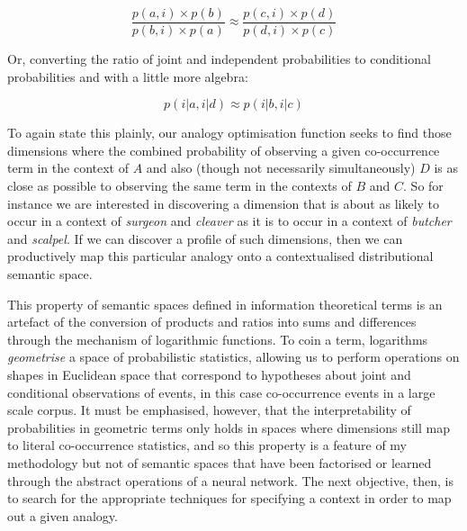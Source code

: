 \begin{equation}
\frac{p(a,i) \times p(b)}{p(b,i) \times p(a)} \approx \frac{p(c,i) \times p(d)}{p(d,i) \times p(c)}
\end{equation}

\noindent Or, converting the ratio of joint and independent probabilities to conditional probabilities and with a little more algebra:

\begin{equation}
p(i|a,i|d) \approx p(i|b,i|c)
\end{equation}

\noindent To again state this plainly, our analogy optimisation function seeks to find those dimensions where the combined probability of observing a given co-occurrence term in the context of $A$ and also (though not necessarily simultaneously) $D$ is as close as possible to observing the same term in the contexts of $B$ and $C$.  So for instance we are interested in discovering a dimension that is about as likely to occur in a context of \emph{surgeon} and \emph{cleaver} as it is to occur in a context of \emph{butcher} and \emph{scalpel}.  If we can discover a profile of such dimensions, then we can productively map this particular analogy onto a contextualised distributional semantic space.

This property of semantic spaces defined in information theoretical terms is an artefact of the conversion of products and ratios into sums and differences through the mechanism of logarithmic functions.  To coin a term, logarithms \emph{geometrise} a space of probabilistic statistics, allowing us to perform operations on shapes in Euclidean space that correspond to hypotheses about joint and conditional observations of events, in this case co-occurrence events in a large scale corpus.  It must be emphasised, however, that the interpretability of probabilities in geometric terms only holds in spaces where dimensions still map to literal co-occurrence statistics, and so this property is a feature of my methodology but not of semantic spaces that have been factorised or learned through the abstract operations of a neural network.  The next objective, then, is to search for the appropriate techniques for specifying a context in order to map out a given analogy.


